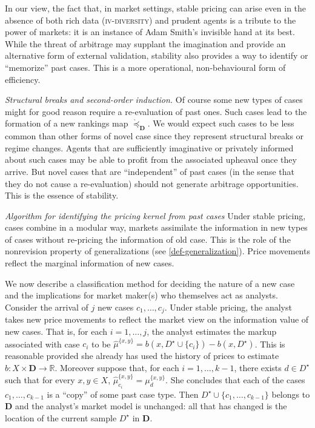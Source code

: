 \documentclass[ecta,nameyear,draft]{econsocart}
\newcommand{\R}{\mathbb R}
\newcommand{\mbbd}{{\mathbf D}}
\newcommand{\past}{{D^\star}}
\newcommand{\fourdiv}{\textsc{iv}-\textsc{diversity}}
\theoremstyle{plain}
\theoremstyle{remark}
\begin{document}
%

In our view, the fact that, in market settings, stable pricing can arise even
in the absence of both rich data (\fourdiv) and prudent agents is a tribute to
the power of markets: it is an instance of Adam Smith's invisible hand at its
best. While the threat of arbitrage may supplant the imagination and provide an
alternative form of external validation, stability also provides a way to
identify or ``memorize'' past cases. This is a more operational,
non-behavioural form of efficiency.

\emph{Structural breaks and second-order induction.} Of course some new
types of cases might for good reason require a re-evaluation of past ones. Such
cases lead to the formation of a new rankings map $\grave{\preceq}_{\mbbd}$. We
would expect such cases to be less common than other forms of novel case since
they represent structural breaks or regime changes.  Agents that are
sufficiently imaginative or privately informed about such cases may be able to
profit from the associated upheaval once they arrive. But novel cases that are
``independent'' of past cases (in the sense that they do not cause a
re-evaluation) should not generate arbitrage opportunities. This is the essence
of stability.

\emph{Algorithm for identifying the pricing kernel from past cases} Under
stable pricing, cases combine in a modular way, markets assimilate the
information in new types of cases without re-pricing the information of old
case. This is the role of the nonrevision property of generalizations (see
\cref{def-generalization}).  Price movements reflect the marginal information
of new cases. 

We now describe a classification method for deciding the nature of a new case
and the implications for market maker(s) who themselves act as analysts.
Consider the arrival of $j$ new cases ${c}_1, \dots, {c}_j$.  Under stable
pricing, the analyst takes new price movements to reflect the market view on
the information value of new cases.  That is, for each $i = 1,\dots, j$, the
analyst estimates the markup associated with case $c_i$ to be
$\hat{\mu}^{\{x,y\}} = b(x, \past \cup \{c_i\}) - b(x, \past) $.  This is
reasonable provided she already has used the history of prices to estimate
$b:X\times \mbbd \rightarrow \R$. Moreover suppose that, for each $i = 1,
\dots, k-1$, there exists $d\in \past$ such that for every $x,y \in X$,
$\hat{\mu}^{\{x,y\}}_{c_i} = \mu^{\{x,y\}}_{d}$.  She concludes that each of
the cases $c_1, \dots, c_{k-1}$ is a ``copy'' of some past case type. Then
$\past \cup \{c_1, \dots, c_{k-1}\}$ belongs to $\mbbd$ and the analyst's
market model is unchanged: all that has changed is the location of the current
sample $\past$ in $\mbbd$.
\end{document}
